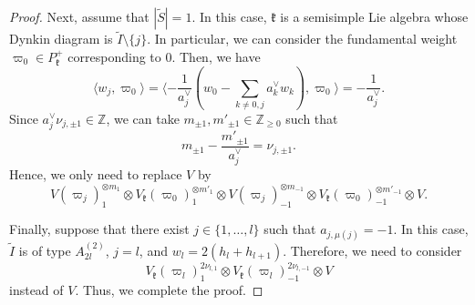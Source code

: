 \documentclass[12pt,a4paper]{amsart}
\theoremstyle{definition}
\numberwithin{equation}{subsection}
\begin{document}
\begin{proof}
  Next, assume that $|\tilde{S}| = 1$.
  In this case, $\mathfrak{k}$ is a semisimple Lie algebra whose Dynkin diagram is $\tilde{I} \setminus \{ j \}$.
  In particular, we can consider the fundamental weight $\varpi_0 \in P_\mathfrak{k}^+$ corresponding to $0$.
  Then, we have
  \[
    \langle w_j, \varpi_0 \rangle = \langle -\frac{1}{a_j^\vee}(w_0 - \sum_{k \neq 0,j} a_k^\vee w_k), \varpi_0 \rangle = -\frac{1}{a_j^\vee}.
  \]
  Since $a_j^\vee \nu_{j,\pm 1} \in \mathbb{Z}$, we can take $m_{\pm 1}, m'_{\pm 1} \in \mathbb{Z}_{\geq 0}$ such that
  \[
    m_{\pm 1} - \frac{m'_{\pm 1}}{a_j^\vee} = \nu_{j,\pm 1}.
  \]
  Hence, we only need to replace $V$ by
  \[
    V(\varpi_j)_1^{\otimes m_1} \otimes V_\mathfrak{k}(\varpi_0)_1^{\otimes m'_1} \otimes V(\varpi_j)_{-1}^{\otimes m_{-1}} \otimes V_\mathfrak{k}(\varpi_0)_{-1}^{\otimes m'_{-1}} \otimes V.
  \]

  Finally, suppose that there exist $j \in \{ 1,\dots,l \}$ such that $a_{j,\mu(j)} = -1$.
  In this case, $\tilde{I}$ is of type $A_{2l}^{(2)}$, $j = l$, and $w_l = 2(h_l + h_{l+1})$.
  Therefore, we need to consider
  \[
    V_\mathfrak{k}(\varpi_l)_1^{2\nu_{l,1}} \otimes V_\mathfrak{k}(\varpi_l)_{-1}^{2\nu_{l,-1}} \otimes V
  \]
  instead of $V$.
  Thus, we complete the proof.
\end{proof}
\end{document}
